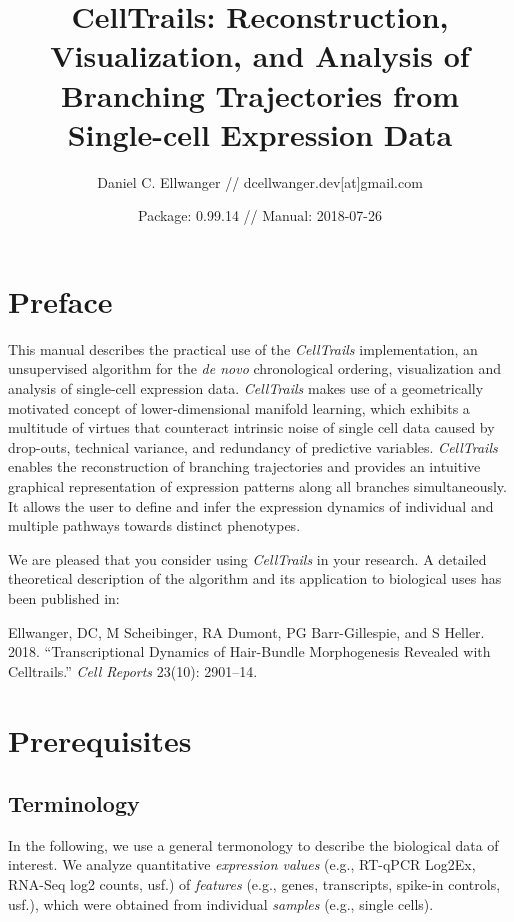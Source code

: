 \documentclass[]{book}
\title{CellTrails: Reconstruction, Visualization, and Analysis of Branching
Trajectories from Single-cell Expression Data}
\author{Daniel C. Ellwanger // dcellwanger.dev{[}at{]}gmail.com}
\date{Package: 0.99.14 // Manual: 2018-07-26}
\theoremstyle{definition}
\theoremstyle{definition}
\theoremstyle{definition}
\theoremstyle{remark}
\begin{document}
\maketitle

{
\setcounter{tocdepth}{1}
\tableofcontents
}
\chapter*{Preface}\label{preface}

This manual describes the practical use of the \emph{CellTrails}
implementation, an unsupervised algorithm for the \emph{de novo}
chronological ordering, visualization and analysis of single-cell
expression data. \emph{CellTrails} makes use of a geometrically
motivated concept of lower-dimensional manifold learning, which exhibits
a multitude of virtues that counteract intrinsic noise of single cell
data caused by drop-outs, technical variance, and redundancy of
predictive variables. \emph{CellTrails} enables the reconstruction of
branching trajectories and provides an intuitive graphical
representation of expression patterns along all branches simultaneously.
It allows the user to define and infer the expression dynamics of
individual and multiple pathways towards distinct phenotypes.

We are pleased that you consider using \emph{CellTrails} in your
research. A detailed theoretical description of the algorithm and its
application to biological uses has been published in:

Ellwanger, DC, M Scheibinger, RA Dumont, PG Barr-Gillespie, and S
Heller. 2018. ``Transcriptional Dynamics of Hair-Bundle Morphogenesis
Revealed with Celltrails.'' \emph{Cell Reports} 23(10): 2901--14.

\chapter{Prerequisites}\label{prerequisites}

\section{Terminology}\label{terminology}

In the following, we use a general termonology to describe the
biological data of interest. We analyze quantitative \emph{expression
values} (e.g., RT-qPCR Log2Ex, RNA-Seq log2 counts, usf.) of
\emph{features} (e.g., genes, transcripts, spike-in controls, usf.),
which were obtained from individual \emph{samples} (e.g., single cells).
\end{document}
